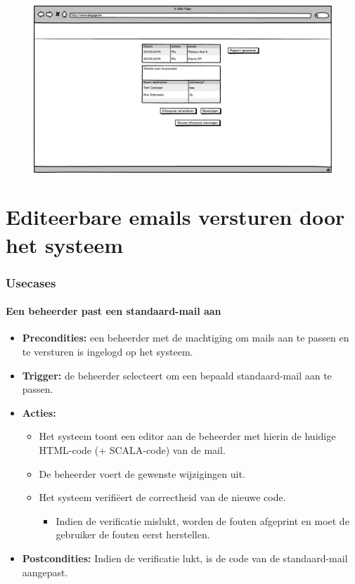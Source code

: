 \documentclass[11pt,a4paper,oneside]{article}
\begin{document}
\begin{figure}[H]\includegraphics[width=\textwidth]{../../mockups/infosessies_beheerder.png}\end{figure}

\setcounter{section}{0}
\setcounter{subsection}{0}
\part{Editeerbare emails versturen door het systeem}

\section{Usecases}

\subsection{Een beheerder past een standaard-mail aan}
\begin{itemize}
\item \textbf{Precondities:} een beheerder met de machtiging om mails aan te passen en te versturen is ingelogd op het systeem.
\item \textbf{Trigger:} de beheerder selecteert om een bepaald standaard-mail aan te passen.
\item \textbf{Acties:} 
\begin{itemize}
	\item	Het systeem toont een editor aan de beheerder met hierin de huidige HTML-code (+ SCALA-code) van de mail.
	\item	De beheerder voert de gewenste wijzigingen uit.
	\item	Het systeem verifi\"{e}ert de correctheid van de nieuwe code.
		\begin{itemize}
			\item Indien de verificatie mislukt, worden de fouten afgeprint en moet de gebruiker de fouten eerst herstellen.
		\end{itemize}
\end{itemize}
\item \textbf{Postcondities:} Indien de verificatie lukt, is de code van de standaard-mail aangepast.
\end{itemize}
\end{document}
